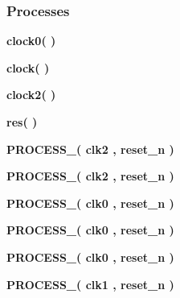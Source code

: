 \subsubsection*{Processes}
 \begin{DoxyCompactItemize}
\item 
{\bf clock0}{\bfseries  (  )}
\item 
{\bf clock}{\bfseries  (  )}
\item 
{\bf clock2}{\bfseries  (  )}
\item 
{\bf res}{\bfseries  (  )}
\item 
{\bf P\+R\+O\+C\+E\+S\+S\+\_}{\bfseries  ( {\bfseries {\bfseries {\bf clk2}} \textcolor{vhdlchar}{ }} , {\bfseries {\bfseries {\bf reset\+\_\+n}} \textcolor{vhdlchar}{ }} )}
\item 
{\bf P\+R\+O\+C\+E\+S\+S\+\_}{\bfseries  ( {\bfseries {\bfseries {\bf clk2}} \textcolor{vhdlchar}{ }} , {\bfseries {\bfseries {\bf reset\+\_\+n}} \textcolor{vhdlchar}{ }} )}
\item 
{\bf P\+R\+O\+C\+E\+S\+S\+\_}{\bfseries  ( {\bfseries {\bfseries {\bf clk0}} \textcolor{vhdlchar}{ }} , {\bfseries {\bfseries {\bf reset\+\_\+n}} \textcolor{vhdlchar}{ }} )}
\item 
{\bf P\+R\+O\+C\+E\+S\+S\+\_}{\bfseries  ( {\bfseries {\bfseries {\bf clk0}} \textcolor{vhdlchar}{ }} , {\bfseries {\bfseries {\bf reset\+\_\+n}} \textcolor{vhdlchar}{ }} )}
\item 
{\bf P\+R\+O\+C\+E\+S\+S\+\_}{\bfseries  ( {\bfseries {\bfseries {\bf clk0}} \textcolor{vhdlchar}{ }} , {\bfseries {\bfseries {\bf reset\+\_\+n}} \textcolor{vhdlchar}{ }} )}
\item 
{\bf P\+R\+O\+C\+E\+S\+S\+\_}{\bfseries  ( {\bfseries {\bfseries {\bf clk1}} \textcolor{vhdlchar}{ }} , {\bfseries {\bfseries {\bf reset\+\_\+n}} \textcolor{vhdlchar}{ }} )}
\end{DoxyCompactItemize}
